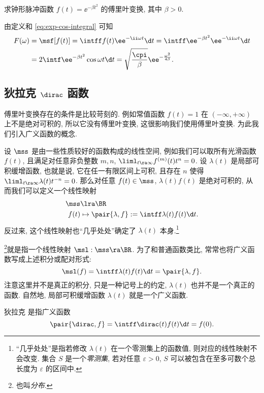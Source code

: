 \begin{example}
  求钟形脉冲函数 $f(t)=\ee^{-\beta t^2}$ 的傅里叶变换, 其中 $\beta>0$.
\end{example}

\begin{solution}
  由定义和 \ref{eq:exp-cos-integral} 可知
  \begin{align*}
    F(\omega)&=\msf[f(t)]=\intff f(t)\ee^{-\ii \omega t}\d t
    =\intff \ee^{-\beta t^2}\ee^{-\ii \omega t}\d t\\
    &=2\intf \ee^{-\beta t^2}\cos \omega t\d t
    =\sqrt{\frac\cpi\beta}\ee^{-\frac{\omega^2}{4\beta}}.
  \end{align*}
\end{solution}


\subsection{狄拉克 \texorpdfstring{$\dirac$}{δ} 函数}

傅里叶变换存在的条件是比较苛刻的.
例如常值函数 $f(t)=1$ 在 $(-\infty,+\infty)$ 上不是绝对可积的, 所以它没有傅里叶变换, 这很影响我们使用傅里叶变换.
为此我们引入广义函数的概念.

设 $\mss$ 是由一些性质较好的函数构成的线性空间, 例如我们可以取所有光滑函数 $f(t)$, 且满足对任意非负整数 $m,n$, $\liml_{t\ra\infty}f^{(m)}(t)t^n=0$.
设 $\lambda(t)$ 是局部可积缓增函数, 也就是说, 它在任一有限区间上可积, 且存在 $n$ 使得 $\liml_{t\ra\infty}\lambda(t)t^{-n}=0$.
那么对任意 $f(t)\in\mss$, $\lambda(t)f(t)$ 是绝对可积的, 从而我们可以定义一个线性映射
\begin{align*}
  \mss&\lra \BR\\
  f(t)&\mapsto \pair{\lambda,f}:=\intff \lambda(t)f(t)\d t.
\end{align*}
反过来, 这个线性映射也``几乎处处''确定了 $\lambda(t)$ 本身.\footnote{
  ``几乎处处''是指若修改 $\lambda(t)$ 在一个零测集上的函数值, 则对应的线性映射不会改变.
  集合 $S$ 是一个\emph{零测集}, 若对任意 $\varepsilon>0$, $S$ 可以被包含在至多可数个总长度为 $\varepsilon$ 的区间中.
}

\footnote{也叫\emph{分布}.}就是指一个线性映射 $\msl:\mss\ra \BR$.
为了和普通函数类比, 常常也将广义函数写成上述积分或配对形式:
\[
  \msl(f)=\intff \lambda(t)f(t)\d t=\pair{\lambda,f}.
\]
注意这里并不是真正的积分, 只是一种记号上的约定, $\lambda(t)$ 也并不是一个真正的函数.
自然地, 局部可积缓增函数 $\lambda(t)$ 就是一个广义函数.

\begin{definition}
  狄拉克 \footnotemark 是指广义函数
  \[
    \pair{\dirac,f}=\intff \dirac(t)f(t)\d t=f(0).
  \]
\end{definition}

